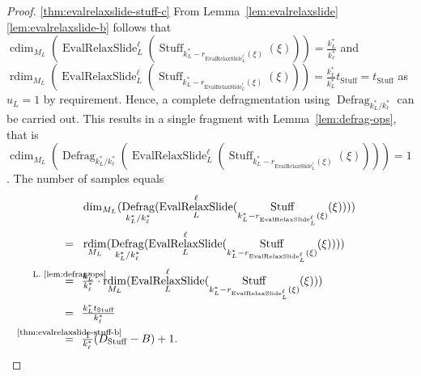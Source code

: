 \documentclass[journal]{IEEEtran}
\newcommand{\ROI}{B}
\DeclareMathOperator{\rdim}{rdim}
\DeclareMathOperator{\cdim}{cdim}
\DeclareMathOperator{\Defragmentation}{Defrag}
\DeclareMathOperator{\Stuffing}{Stuff}
\newcommand{\equsing}[1]{\overset{\mathclap{\text{#1}}}{=}}
\DeclareMathOperator{\EvalRelaxSlide}{EvalRelaxSlide}
\begin{document}
\begin{proof}
\ref{thm:evalrelaxslide-stuff-c}
From Lemma~\ref{lem:evalrelaxslide}\ref{lem:evalrelaxslide-b} follows that $\cdim_{M_L}( \EvalRelaxSlide_L^\ell( \Stuffing_{k_L^* - r_{\EvalRelaxSlide_L^\ell}(\xi)}(\xi) ) ) = \frac{k_L^*}{k_\ell^*}$ and $\rdim_{M_L}( \EvalRelaxSlide_L^\ell( \Stuffing_{k_L^* - r_{\EvalRelaxSlide_L^\ell}(\xi)}(\xi) ) ) = \frac{k_L^*}{k_L^*}t_{\Stuffing} = t_{\Stuffing}$ as $u_L = 1$ by requirement.
Hence, a complete defragmentation using $\Defragmentation_{k_L^* / k_\ell^*}$ can be carried out.
This results in a single fragment with Lemma~\ref{lem:defrag-ops}, that is $\cdim_{M_L}( \Defragmentation_{k_L^* / k_\ell^*}( \EvalRelaxSlide_L^\ell( \Stuffing_{k_L^* - r_{\EvalRelaxSlide_L^\ell}(\xi)}(\xi) ) ) ) = 1$.
The number of samples equals
\begin{align*}
  & \dim_{M_L}( \Defragmentation_{k_L^* / k_\ell^*}( \EvalRelaxSlide_L^\ell( \Stuffing_{k_L^* - r_{\EvalRelaxSlide_L^\ell}(\xi)}(\xi) ) ) )\\
  =\ \ & \rdim_{M_L}( \Defragmentation_{k_L^* / k_\ell^*}( \EvalRelaxSlide_L^\ell( \Stuffing_{k_L^* - r_{\EvalRelaxSlide_L^\ell}(\xi)}(\xi) ) ) )\\
  \equsing{L.~\ref{lem:defrag-ops}}\ \ & \tfrac{k_L^*}{k_\ell^*}\cdot\rdim_{M_L}( \EvalRelaxSlide_L^\ell( \Stuffing_{k_L^* - r_{\EvalRelaxSlide_L^\ell}(\xi)}(\xi) ) )\\
  =\ \ & \tfrac{k_L^*t_{\Stuffing}}{k_\ell^*}\\
  \equsing{\ref{thm:evalrelaxslide-stuff-b}}\ \ & \tfrac{1}{k_\ell^*}(D_{\Stuffing} - \ROI) + 1\text{.}
\end{align*}


\end{proof}
\end{document}
